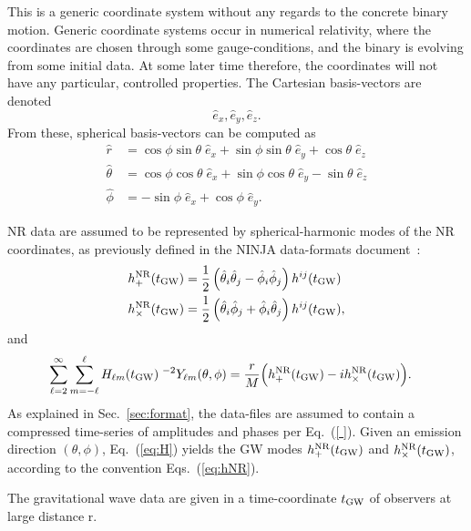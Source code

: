 \documentclass[11pt,tightenlines,article,amssymb,amsmath,amsfonts,superscriptaddress,nofootinbib]{revtex4}
\newcommand{\ExNR}{\hat e_x}
\newcommand{\EyNR}{\hat e_y}
\newcommand{\EzNR}{\hat e_z}
\newcommand{\tNR}{\theta}
\newcommand{\pNR}{\phi}
\newcommand{\ErNR}{{\hat r}}
\newcommand{\EtNR}{{\hat\theta}}
\newcommand{\EpNR}{{\hat\phi}}
\newcommand{\hpNR}{h_+^{\rm NR}}
\newcommand{\hcNR}{h_{\times}^{\rm NR}}
\newcommand{\tGW}{t_{\rm GW}}
\begin{document}
This is a generic coordinate system without any regards to the
concrete binary motion. Generic coordinate systems occur in numerical
relativity, where the coordinates are chosen through some
gauge-conditions, and the binary is evolving from some initial data.
At some later time therefore, the coordinates will not have any
particular, controlled properties.
The Cartesian basis-vectors are denoted
\begin{equation}
  \ExNR, \EyNR, \EzNR.
\end{equation}
From these, spherical basis-vectors can be computed as
\begin{subequations}
  \label{eq:NRspherical}
\begin{align}
  \ErNR & = \cos\pNR\sin\tNR\;\ExNR + \sin\pNR\sin\tNR\;\EyNR +\cos\tNR\;\EzNR\\
  \EtNR & = \cos\pNR\cos\tNR\;\ExNR + \sin\pNR\cos\tNR\;\EyNR -\sin\tNR\;\EzNR\\
  \EpNR & =        -\sin\pNR\;\ExNR +         \cos\pNR\;\EyNR.
\end{align}
\end{subequations}

NR data are assumed to be represented by spherical-harmonic modes of the
NR coordinates, as previously defined in the NINJA data-formats
document~\cite{Brown:2007jx}:
\begin{subequations}\label{eq:hNR}
\begin{align}
  \hpNR(\tGW) & = \frac{1}{2}\left(\EtNR_i\EtNR_j-\EpNR_i\EpNR_j\right)h^{ij}(\tGW)\\
  \hcNR(\tGW) & = \frac{1}{2}\left(\EtNR_i\EpNR_j+\EpNR_i\EtNR_j\right)h^{ij}(\tGW),
\end{align}
\end{subequations}
and
\begin{align}\label{eq:H}
  \sum_{\ell=2}^\infty\sum_{m=-\ell}^\ell H_{\ell m}&(\tGW)\;^{-2}Y_{\ell m}(\tNR,\pNR)
  = \frac{r}{M}\Big(\hpNR(\tGW)-i\hcNR(\tGW)\Big). %
\end{align}
As explained in Sec.~\ref{sec:format}, the data-files are assumed to
contain a compressed time-series of amplitudes and phases per
Eq.~(\ref{ }).  Given an emission direction $(\tNR,\pNR)$,
Eq.~(\ref{eq:H}) yields the GW modes $\hpNR(\tGW)$ and $\hcNR(\tGW)$,
according to the convention Eqs.~(\ref{eq:hNR}).

The gravitational wave data are given in a time-coordinate $\tGW$ of
observers at large distance r.
\end{document}
